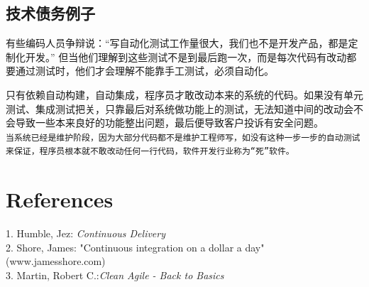\hypertarget{ux6280ux672fux503aux52a1ux4f8bux5b50}{%
\subsection{技术债务例子}\label{ux6280ux672fux503aux52a1ux4f8bux5b50}}


有些编码人员争辩说：``写自动化测试工作量很大，我们也不是开发产品，都是定制化开发。''
但当他们理解到这些测试不是到最后跑一次，而是每次代码有改动都要通过测试时，他们才会理解不能靠手工测试，必须自动化。

只有依赖自动构建，自动集成，程序员才敢改动本来的系统的代码。如果没有单元测试、集成测试把关，只靠最后对系统做功能上的测试，无法知道中间的改动会不会导致一些本来良好的功能整出问题，最后便导致客户投诉有安全问题。\\

\texttt{当系统已经是维护阶段，因为大部分代码都不是维护工程师写，如没有这种一步一步的自动测试来保证，程序员根本就不敢改动任何一行代码，软件开发行业称为“死”软件。}~\\

\hypertarget{references}{%
\section{References}\label{references}}

1. Humble, Jez: \emph{Continuous Delivery}\\
2. Shore, James: "Continuous integration on a dollar a day"
(www.jamesshore.com)\\
3. Martin, Robert C.:\emph{Clean Agile - Back to Basics}\\



